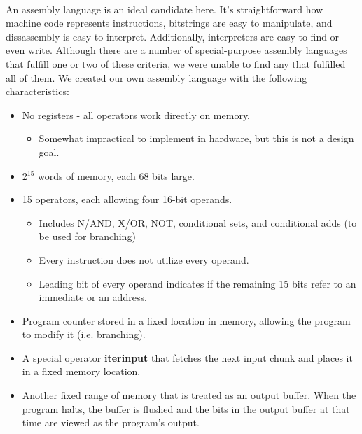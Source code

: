 \documentclass{article}
\begin{document}
\paragraph{}
An assembly language is an ideal candidate here. It's straightforward how machine code represents instructions, bitstrings are easy to manipulate, and dissassembly is easy to interpret. Additionally, interpreters are easy to find or even write.
Although there are a number of special-purpose assembly languages that fulfill one or two of these criteria, we were unable to find any that fulfilled all of them. We created our own assembly language with the following characteristics:

\begin{itemize}
\item No registers - all operators work directly on memory.
	\begin{itemize}
          \item Somewhat impractical to implement in hardware, but this is not a design goal.
	\end{itemize}
	\item 2$^{15}$ words of memory, each 68 bits large.
	\item 15 operators, each allowing four 16-bit operands.
	\begin{itemize}
		  \item Includes N/AND, X/OR, NOT, conditional sets, and conditional adds (to be used for branching)
          \item Every instruction does not utilize every operand.
          \item Leading bit of every operand indicates if the remaining 15 bits refer to an immediate or an address.
	\end{itemize}
	\item Program counter stored in a fixed location in memory, allowing the program to modify it (i.e. branching).
	\item A special operator \textbf{iterinput} that fetches the next input chunk and places it in a fixed memory location.
	\item Another fixed range of memory that is treated as an output buffer. When the program halts, the buffer is flushed and the bits in the output buffer at that time are viewed as the program's output.
\end{itemize}
\end{document}
